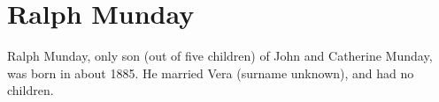 \section{Ralph Munday}\label{Ralph_Munday}

Ralph Munday, only son (out of five children) of John and Catherine Munday, was born in about 1885. He married Vera (surname unknown), and had no children.
